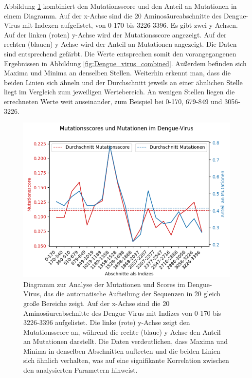 \documentclass[german,version-2022-01]{uzl-thesis}
\begin{document}
Abbildung \ref{fig:Dengue_virus_scores_and_mutations_bereiche} kombiniert den Mutationsscore und den Anteil an Mutationen in einem Diagramm. Auf der x-Achse sind die 20 Aminos\"aureabschnitte des Dengue-Virus mit Indexen aufgelistet, von 0-170 bis 3226-3396. Es gibt zwei y-Achsen. Auf der linken (roten) y-Achse wird der Mutationsscore angezeigt. Auf der rechten (blauen) y-Achse wird der Anteil an Mutationen angezeigt. Die Daten sind entsprechend gef\"arbt. Die Werte entsprechen somit den vorangegangenen Ergebnissen in Abbildung \ref{fig:Dengue_virus_combined}. Au\ss{}erdem befinden sich Maxima und Minima an denselben Stellen. Weiterhin erkennt man, dass die beiden Linien sich \"ahneln und der Durchschnitt jeweils an einer \"ahnlichen Stelle liegt im Vergleich zum jeweiligen Wertebereich. An wenigen Stellen liegen die errechneten Werte weit auseinander, zum Beispiel bei 0-170, 679-849 und 3056-3226.
\begin{figure}[tbp]
  \centering
  \includegraphics[scale=0.65]{Images/Diagramm_Scores_und_Mutationen_Dengue_viren_Bereiche.png}
  \caption{Diagramm zur Analyse der Mutationen und Scores im Dengue-Virus, das die automatische Aufteilung der Sequenzen in 20 gleich gro\ss{}e Bereiche zeigt. Auf der x-Achse sind die 20 Aminos\"aureabschnitte des Dengue-Virus mit Indizes von 0-170 bis 3226-3396 aufgelistet. Die linke (rote) y-Achse zeigt den Mutationsscore an, w\"ahrend die rechte (blaue) y-Achse den Anteil an Mutationen darstellt. Die Daten verdeutlichen, dass Maxima und Minima in denselben Abschnitten auftreten und die beiden Linien sich \"ahnlich verhalten, was auf eine signifikante Korrelation zwischen den analysierten Parametern hinweist.}
  \label{fig:Dengue_virus_scores_and_mutations_bereiche}
\end{figure}
\end{document}
